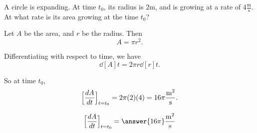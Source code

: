 \documentclass{ximera}
\author{Steven Gubkin}
\begin{document}
\begin{exercise}

A circle is expanding.  At time $t_0$, its radius is $2 \textrm{m}$,
and is growing at a rate of $4 \frac{\textrm{m}}{\textrm{s}}$.  At
what rate is its area growing at the time $t_0$?

\begin{hint}
  Let $A$ be the area, and $r$ be the radius.  Then
  \[
  A = \pi r^2.
  \]
\end{hint}

\begin{hint}
  Differentiating with respect to time, we have
  \[
  \dd[A]{t} = 2\pi r \dd[r]{t}.
  \]
\end{hint}

\begin{hint}
  So at time $t_0$,
  \[
  \Bigl[\dd[A]{t}\Bigr]_  {t=t_0} = 2 \pi (2) (4) = 16 \pi\frac{\textrm{m}^2}{\textrm{s}}.
  \]
\end{hint}

\begin{prompt}
  \[
 \Bigl[\dd[A]{t}\Bigr]_  {t=t_0}  = \answer{16\pi}\frac{\textrm{m}^2}{\textrm{s}}
  \]
\end{prompt}

\end{exercise}
\end{document}

